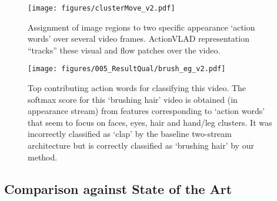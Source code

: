 \documentclass[10pt,twocolumn,letterpaper]{article}
\newcommand{\methodTag}[0]{ActionVLAD}
\begin{document}
\begin{figure}[t]
    \centering
    \texttt{[image: figures/clusterMove\_v2.pdf]}
    \caption{Assignment of image regions to two specific appearance `action words' over several video frames. \methodTag{} representation ``tracks''
    these visual and flow patches over the video.
            }\label{fig:cluster_center_movement}
\end{figure}

\begin{figure}[t]
    \centering
    \texttt{[image: figures/005\_ResultQual/brush\_eg\_v2.pdf]}
        \caption{
    Top contributing action words for classifying this video.  
    The softmax score for this `brushing
    hair' video is obtained (in appearance stream) from features corresponding to `action words'
    that seem to focus on
    faces, eyes, hair and hand/leg clusters. It was incorrectly classified as `clap' by the baseline two-stream architecture but is correctly classified as `brushing hair' by our method.}\label{fig:qual_res}
  \end{figure}


\subsection{Comparison against State of the Art}\label{sec:expts:final}
\end{document}
